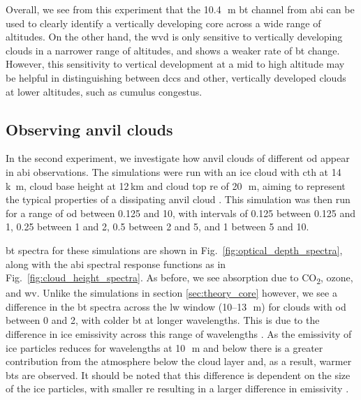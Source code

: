 Overall, we see from this experiment that the 10.4\,\unit{\mu m} \acrshort{bt} channel from \acrshort{abi} can be used to clearly identify a vertically developing core across a wide range of altitudes.
On the other hand, the \acrshort{wvd} is only sensitive to vertically developing clouds in a narrower range of altitudes, and shows a weaker rate of \acrshort{bt} change.
However, this sensitivity to vertical development at a mid to high altitude may be helpful in distinguishing between \acrshort{dcc}s and other, vertically developed clouds at lower altitudes, such as cumulus congestus.


\subsection{Observing anvil clouds}

In the second experiment, we investigate how anvil clouds of different \acrfull{od} appear in \acrshort{abi} observations.
The simulations were run with an ice cloud with \acrshort{cth} at 14\,\unit{k m}, cloud base height at 12\,\unit{km} and cloud top \acrshort{re} of 20\,\unit{\mu m}, aiming to represent the typical properties of a dissipating anvil cloud \citep{sokol_tropical_2020}.
This simulation was then run for a range of \acrshort{od} between 0.125 and 10, with intervals of 0.125 between 0.125 and 1, 0.25 between 1 and 2, 0.5 between 2 and 5, and 1 between 5 and 10.

\acrshort{bt} spectra for these simulations are shown in Fig.~\ref{fig:optical_depth_spectra}, along with the \acrshort{abi} spectral response functions as in Fig.~\ref{fig:cloud_height_spectra}.
As before, we see absorption due to CO\textsubscript{2}, ozone, and \acrshort{wv}.
Unlike the simulations in section \ref{sec:theory_core} however, we see a difference in the \acrshort{bt} spectra across the \acrshort{lw} window (10--13\,\unit{\mu m}) for clouds with \acrshort{od} between 0 and 2, with colder \acrshort{bt} at longer wavelengths.
This is due to the difference in ice emissivity across this range of wavelengths \citep{fu_radiation_2015}.
As the emissivity of ice particles reduces for wavelengths at 10\,\unit{\mu m} and below there is a greater contribution from the atmosphere below the cloud layer and, as a result, warmer \acrshort{bt}s are observed.
It should be noted that this difference is dependent on the size of the ice particles, with smaller \acrshort{re} resulting in a larger difference in emissivity \citep{dubuisson_sensitivity_2008}.


